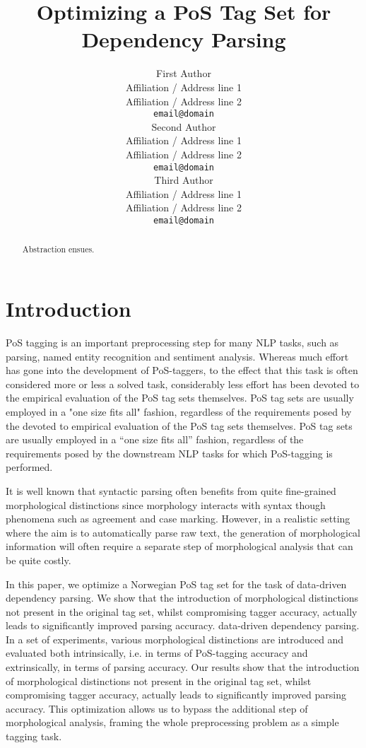 \documentclass[11pt,a4paper]{article}
\title{Optimizing a PoS Tag Set for Dependency Parsing}
\author{First Author \\
  Affiliation / Address line 1 \\
  Affiliation / Address line 2 \\
  {\tt email@domain} \\\And
  Second Author \\
  Affiliation / Address line 1 \\
  Affiliation / Address line 2 \\
  {\tt email@domain}  \\\And
  Third Author \\
  Affiliation / Address line 1 \\
  Affiliation / Address line 2 \\
  {\tt email@domain} \\}
\date{}
\begin{document}
\maketitle
\begin{abstract}
Abstraction ensues.
\end{abstract}


\section{Introduction}
\label{sec:intro}
PoS tagging is an important preprocessing step for many NLP
tasks, such as parsing, named entity recognition and sentiment
analysis. Whereas much effort has gone into the development of
PoS-taggers, to the effect that this task is often considered
more or less a solved task, considerably less effort has been
devoted to the empirical evaluation of the PoS tag sets
themselves.
PoS tag sets are usually employed in a "one size fits
all" fashion, regardless of the requirements posed by the
devoted to empirical evaluation of the PoS tag sets
themselves.
PoS tag sets are usually employed in a ``one size fits
all'' fashion, regardless of the requirements posed by the
downstream NLP tasks for which PoS-tagging is performed.

It is well known that syntactic parsing often benefits from quite
fine-grained morphological distinctions since morphology interacts
with syntax though phenomena such as agreement and case
marking. However, in a realistic setting where the aim is to
automatically parse raw text, the generation of morphological
information will often require a separate step of morphological
analysis that can be quite costly.

In this paper, we optimize a Norwegian PoS tag set for the task of
data-driven dependency parsing.  We show that the introduction of
morphological distinctions not present in the original tag set, whilst
compromising tagger accuracy, actually leads to significantly improved
parsing accuracy.
data-driven dependency parsing. In a set of experiments, various
morphological distinctions are introduced and evaluated both
intrinsically, i.e. in terms of PoS-tagging accuracy and
extrinsically, in terms of parsing accuracy.  Our results show that
the introduction of morphological distinctions not present in the
original tag set, whilst compromising tagger accuracy, actually leads
to significantly improved parsing accuracy. This optimization allows
us to bypass the additional step of morphological analysis, framing
the whole preprocessing problem as a simple tagging task.
\end{document}
